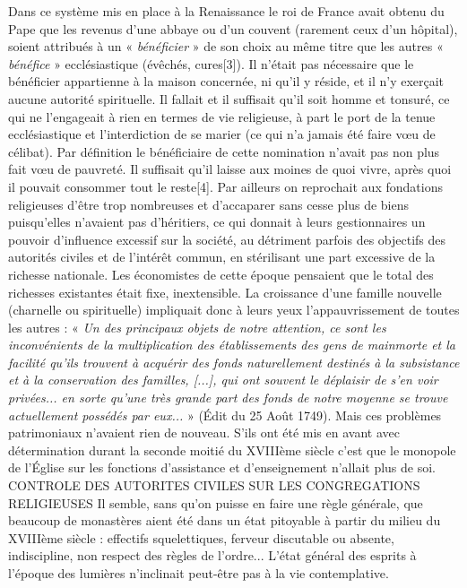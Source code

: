  Dans ce système mis en place à la Renaissance le roi de France avait obtenu du Pape que les revenus d'une abbaye ou d'un couvent (rarement ceux d'un hôpital), soient attribués à un « \emph{bénéficier} » de son choix au même titre que les autres « \emph{bénéfice} » ecclésiastique (évêchés, cures[3]). Il n'était pas nécessaire que le bénéficier appartienne à la maison concernée, ni qu'il y réside, et il n'y exerçait aucune autorité spirituelle. Il fallait et il suffisait qu'il soit homme et tonsuré, ce qui ne l'engageait à rien en termes de vie religieuse, à part le port de la tenue ecclésiastique et l'interdiction de se marier (ce qui n'a jamais été faire vœu de célibat). Par définition le bénéficiaire de cette nomination n'avait pas non plus fait vœu de pauvreté. Il suffisait qu'il laisse aux moines de quoi vivre, après quoi il pouvait consommer tout le reste[4].
 Par ailleurs on reprochait aux fondations religieuses d'être trop nombreuses et d'accaparer sans cesse plus de biens puisqu'elles n'avaient pas d'héritiers, ce qui donnait à leurs gestionnaires un pouvoir d'influence excessif sur la société, au détriment parfois des objectifs des autorités civiles et de l'intérêt commun, en stérilisant une part excessive de la richesse nationale. Les économistes de cette époque pensaient que le total des richesses existantes était fixe, inextensible. La croissance d'une famille nouvelle (charnelle ou spirituelle) impliquait donc à leurs yeux l'appauvrissement de toutes les autres : « \emph{Un des principaux objets de notre attention, ce sont les inconvénients de la multiplication des établissements des gens de mainmorte et la facilité qu'ils trouvent à acquérir des fonds naturellement destinés à la subsistance et à la conservation des familles, [...], qui ont souvent le déplaisir de s'en voir privées... en sorte qu'une très grande part des fonds de notre moyenne se trouve actuellement possédés par eux...} » (Édit du 25 Août 1749). 
 Mais ces problèmes patrimoniaux n'avaient rien de nouveau. S'ils ont été mis en avant avec détermination durant la seconde moitié du XVIIIème siècle c'est que le monopole de l'Église sur les fonctions d'assistance et d'enseignement n'allait plus de soi. 
CONTROLE DES AUTORITES CIVILES SUR LES CONGREGATIONS RELIGIEUSES
 Il semble, sans qu'on puisse en faire une règle générale, que beaucoup de monastères aient été dans un état pitoyable à partir du milieu du XVIIIème siècle : effectifs squelettiques, ferveur discutable ou absente, indiscipline, non respect des règles de l'ordre... L'état général des esprits à l'époque des lumières n'inclinait peut-être pas à la vie contemplative.
